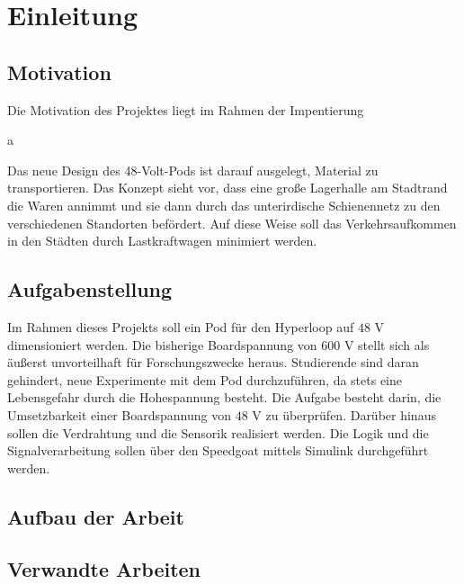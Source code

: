 \chapter{Einleitung}

\section{Motivation}

Die Motivation des Projektes liegt im Rahmen der Impentierung

a

Das neue Design des 48-Volt-Pods ist darauf ausgelegt, Material zu transportieren. Das Konzept sieht vor, dass eine große Lagerhalle am Stadtrand die Waren annimmt und sie dann durch das unterirdische Schienennetz zu den verschiedenen Standorten befördert. Auf diese Weise soll das Verkehrsaufkommen in den Städten durch Lastkraftwagen minimiert werden.


\section{Aufgabenstellung}
Im Rahmen dieses Projekts soll ein Pod für den Hyperloop auf $48$ V dimensioniert werden. Die bisherige Boardspannung von 600 V stellt sich als äußerst unvorteilhaft für Forschungszwecke heraus. Studierende sind daran gehindert, neue Experimente mit dem Pod durchzuführen, da stets eine Lebensgefahr durch die Hohespannung besteht.
Die Aufgabe besteht darin, die Umsetzbarkeit einer Boardspannung von $48$ V zu überprüfen. Darüber hinaus sollen die Verdrahtung und die Sensorik realisiert werden. Die Logik und die Signalverarbeitung sollen über den Speedgoat mittels Simulink durchgeführt werden.

\section{Aufbau der Arbeit}

\section{Verwandte Arbeiten}

\pagebreak

